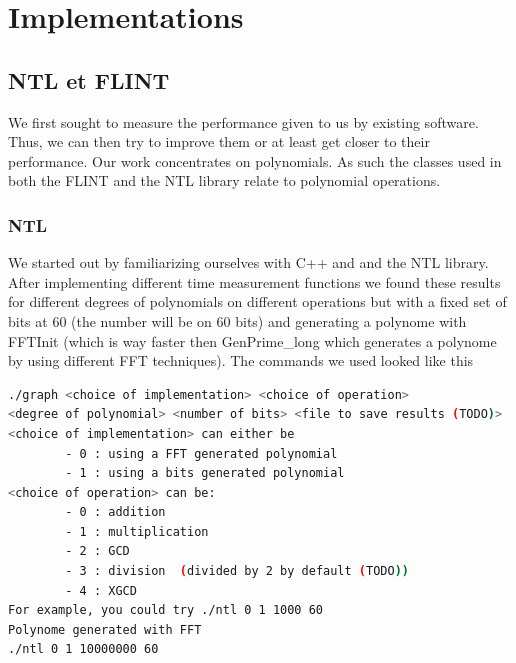 \newpage
\section{Implementations}
\subsection{NTL et FLINT}
We first sought to measure the performance given to us by existing software. Thus, we can then try to improve them or at least get closer to their performance.
Our work concentrates on polynomials. As such the classes used in both the FLINT and the NTL library relate to polynomial operations.
\subsubsection{NTL}

We started out by familiarizing ourselves with C++ and and the NTL library.
After implementing different time measurement functions we found these results for different degrees of polynomials on different operations but with a fixed set of bits at 60 (the number will be on 60 bits) and generating a polynome with FFTInit (which is way faster then GenPrime\_long which generates a polynome by using different FFT techniques).
The commands we used looked like this 
\begin{lstlisting}[language=bash]
./graph <choice of implementation> <choice of operation> 
<degree of polynomial> <number of bits> <file to save results (TODO)>
<choice of implementation> can either be
        - 0 : using a FFT generated polynomial
        - 1 : using a bits generated polynomial
<choice of operation> can be:
        - 0 : addition
        - 1 : multiplication
        - 2 : GCD
        - 3 : division  (divided by 2 by default (TODO))
        - 4 : XGCD 
For example, you could try ./ntl 0 1 1000 60
Polynome generated with FFT
./ntl 0 1 10000000 60
\end{lstlisting}

